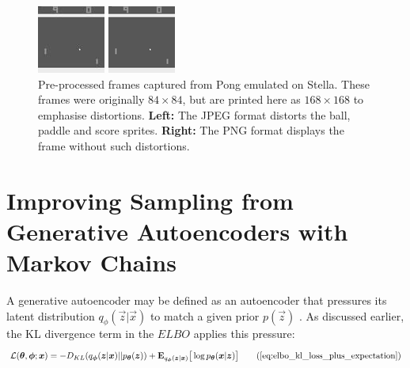 \begin{figure}[h!]
\centering
\captionsetup{justification=centering}
\begin{multicols}{1}
    \includegraphics[scale=2.0]{figures/related_work/pong_729_pre_processed.jpeg}\par
    \includegraphics[scale=2.0]{figures/related_work/pong_729_pre_processed.png}\par
\end{multicols}
\caption{Pre-processed frames captured from Pong emulated on Stella. These frames were originally $84\times 84$, but are printed here as $168\times 168$ to emphasise distortions. \textbf{Left:} The JPEG format distorts the ball, paddle and score sprites. \textbf{Right:} The PNG format displays the frame without such distortions.}
\label{fig:pong_729_pre_processed}
\end{figure}




%
%
%
%
%
\section{Improving Sampling from Generative Autoencoders with Markov Chains}

A generative autoencoder may be defined as an autoencoder that pressures its latent distribution $q_{\phi}(\vec{z} | \vec{x})$ to match a given prior $p(\vec{z})$ \cite{Creswell2016}. As discussed earlier, the KL divergence term in the $ELBO$ applies this pressure:
\begin{align}
\mathcal{L}(\vec{\theta}, \vec{\phi}; \vec{x}) = -D_{KL}(q_{\vec{\phi}}(\vec{z}|\vec{x}) || p_{\vec{\theta}}(\vec{z})) + \mathbf{E}_{q_{\vec{\phi}}(\vec{z}|\vec{x})}\big[\log p_{\vec{\theta}}(\vec{x} | \vec{z}) \big]
\tag{\ref{eq:elbo_kl_loss_plus_expectation}}
\end{align}

